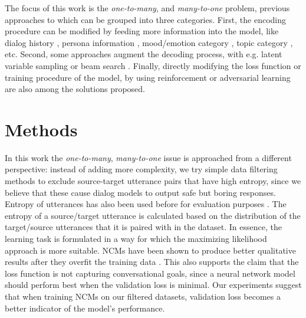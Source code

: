 \documentclass[11pt,a4paper]{article}
\begin{document}
The focus of this work is the \textit{one-to-many}, and \textit{many-to-one} problem,
previous approaches to which can be grouped into three
categories. First, the encoding procedure can be modified by feeding more
information into the model, like dialog history \cite{Serban:2015}, persona
information \cite{Li:2016a,Joshi:2017,Zhang:2018}, mood/emotion category
\cite{Zhou:2017,Li:2017b}, topic category \cite{Xing:2017, Liu:2017}, etc. Second, some approaches augment the decoding process, with
e.g. latent variable sampling \cite{Serban:2017b,Zhao:2017} or
beam search \cite{Goyal:2017,Wiseman:2016,Shao:2017b}. Finally, directly
modifying the loss function \cite{Wiseman:2016} or training procedure of the
model, by using reinforcement \cite{Li:2016b,
  Serban:2017a,Li:2016c,Lipton:2017} or adversarial learning \cite{Li:2017a} are also
  among the solutions proposed.

\section{Methods}
\label{sec:methods}

In this work the \textit{one-to-many}, \textit{many-to-one} issue is
approached from a different perspective: instead of adding more complexity, we
try simple data filtering methods to exclude source-target utterance pairs
that have high entropy, since we believe that these cause dialog models to
output safe but boring responses. Entropy of utterances has also been used before for evaluation purposes \cite{Serban:2017b}. The entropy of a source/target utterance is
calculated based on the distribution of the target/source utterances that it
is paired with in the dataset. In essence, the learning task is formulated in
a way for which the maximizing likelihood approach is more suitable.
NCMs have been shown to produce better qualitative results after they overfit
the training data
\cite{Csaky:2017,Tandon:2017}. This also supports the claim that the loss
function is not capturing conversational goals, since a neural network model
should perform best when the validation loss is minimal. Our experiments
suggest that when training NCMs on our filtered datasets, validation loss
becomes a better indicator of the model's performance.
\end{document}
